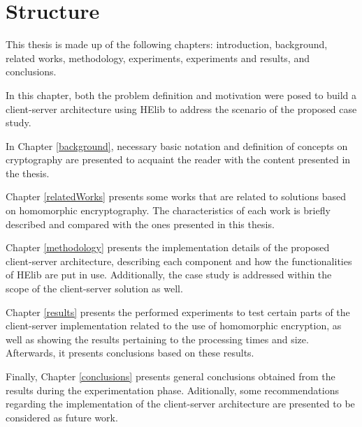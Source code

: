 \section{Structure}
This thesis is made up of the following chapters: introduction, background, related works, methodology, experiments, experiments and results, and conclusions.

In this chapter, both the problem definition and motivation were posed to build a client-server architecture using HElib to address the scenario of the proposed case study.

In Chapter \ref{background}, necessary basic notation and definition of concepts on cryptography are presented to acquaint the reader with the content presented in the thesis.

Chapter \ref{relatedWorks} presents some works that are related to solutions based on homomorphic encryptography. The characteristics of each work is briefly described and compared with the ones presented in this thesis.

Chapter \ref{methodology} presents the implementation details of the proposed client-server architecture, describing each component and how the functionalities of HElib are put in use. Additionally, the case study is addressed within the scope of the client-server solution as well.

Chapter \ref{results} presents the performed experiments to test certain parts of the client-server implementation related to the use of homomorphic encryption, as well as showing the results pertaining to the processing times and size. Afterwards, it presents conclusions based on these results.

Finally, Chapter \ref{conclusions} presents general conclusions obtained from the results during the experimentation phase. Aditionally, some recommendations regarding the implementation of the client-server architecture are presented to be considered as future work.

\clearpage
